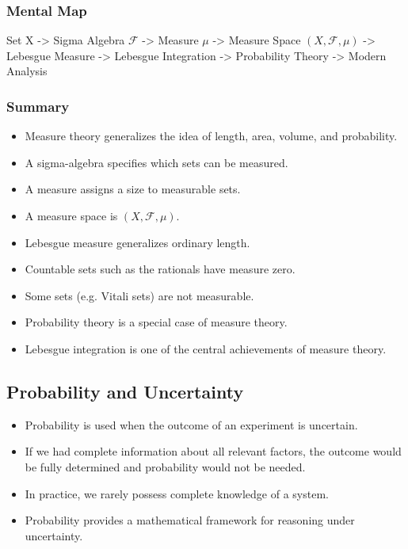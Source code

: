 \documentclass[11pt]{article}
\begin{document}
\subsubsection{Mental Map}
\label{sec:org2759fac}

Set X
  ->
Sigma Algebra \(\mathcal F\)
  ->
Measure \(\mu\)
  ->
Measure Space \((X,\mathcal F,\mu)\)
  ->
Lebesgue Measure
  ->
Lebesgue Integration
  ->
Probability Theory
  ->
Modern Analysis
\subsubsection{Summary}
\label{sec:org0ec55d8}

\begin{itemize}
\item Measure theory generalizes the idea of length, area, volume, and probability.
\item A sigma-algebra specifies which sets can be measured.
\item A measure assigns a size to measurable sets.
\item A measure space is \((X,\mathcal F,\mu)\).
\item Lebesgue measure generalizes ordinary length.
\item Countable sets such as the rationals have measure zero.
\item Some sets (e.g. Vitali sets) are not measurable.
\item Probability theory is a special case of measure theory.
\item Lebesgue integration is one of the central achievements of measure theory.
\end{itemize}
\subsection{Probability and Uncertainty}
\label{sec:org7794707}

\begin{itemize}
\item Probability is used when the outcome of an experiment is uncertain.
\item If we had complete information about all relevant factors, the outcome would be fully determined and probability would not be needed.
\item In practice, we rarely possess complete knowledge of a system.
\item Probability provides a mathematical framework for reasoning under uncertainty.
\end{itemize}
\end{document}
